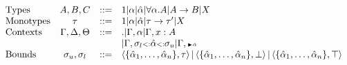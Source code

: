\documentclass[paper.tex]{subfiles}
\begin{document}
\[
\begin{array}{lccl}
\text{Types} & A,B,C &::=& 1 | \alpha | \hat{\alpha} | \forall \alpha.A | A \rightarrow B | X\\
\text{Monotypes} & \tau &::=& 1 | \alpha | \hat{\alpha} | \tau \rightarrow \tau' | X \\
\text{Contexts} & \Gamma, \Delta, \Theta &::=& . | \Gamma, \alpha | \Gamma, x:A \\ &&& | \Gamma, \sigma_{l} {\scriptstyle{<:}} \hat{\alpha} {\scriptstyle{<:}} \sigma_{u} | \Gamma, {\scriptscriptstyle {\blacktriangleright \hat{\alpha}}}\\
\text{Bounds} & \sigma_{u}, \sigma_{l} &::=& \left<\{\hat{\alpha}_1,\ldots,\hat{\alpha}_n\},\tau\right> | \left<\{\hat{\alpha}_1,\ldots,\hat{\alpha}_n\},\bot\right> | \left<\{\hat{\alpha}_1,\ldots,\hat{\alpha}_n\},\top\right>\\
\end{array}
\]
\end{document}
